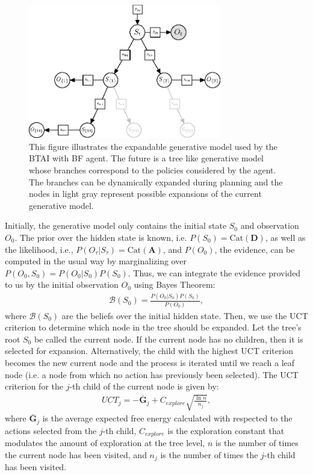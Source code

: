\documentclass[twoside,11pt]{article}
\begin{document}
\begin{figure}[H]
	\begin{center}
	\includegraphics[width=0.75\textwidth]{BTAI_BF-figure0.eps}
 	\end{center}
\vspace{-0.25cm}
    \caption{
This figure illustrates the expandable generative model used by the BTAI with BF agent. The future is a tree like generative model whose branches correspond to the policies considered by the agent. The branches can be dynamically expanded during planning and the nodes in light gray represent possible expansions of the current generative model.}
    \label{fig:BTAI_BF}
\end{figure}

Initially, the generative model only contains the initial state $S_0$ and observation $O_0$. The prior over the hidden state is known, i.e. $P(S_0) = \text{Cat}(\bm{D})$, as well as the likelihood, i.e., $P(O_\tau|S_\tau) = \text{Cat}(\bm{A})$, and $P(O_0)$, the evidence, can be computed in the usual way by marginalizing over $P(O_0,S_0) = P(O_0|S_0)P(S_0)$. Thus, we can integrate the evidence provided to us by the initial observation $O_0$ using Bayes Theorem:
\begin{align}\label{eq:initial_beliefs}
\mathcal{B}(S_0) = \frac{P(O_0|S_0)P(S_0)}{P(O_0)},
\end{align}
where $\mathcal{B}(S_0)$ are the beliefs over the initial hidden state. Then, we use the UCT criterion to determine which node in the tree should be expanded. Let the tree's root $S_0$ be called the current node. If the current node has no children, then it is selected for expansion. Alternatively, the child with the highest UCT criterion becomes the new current node and the process is iterated until we reach a leaf node (i.e. a node from which no action has previously been selected). The UCT criterion \citep{6145622} for the $j$-th child of the current node is given by:
\begin{align}\label{eq:UCT}
UCT_j = - \bar{\bm{G}}_j + C_{explore} \sqrt{\frac{\ln n}{n_j}},
\end{align}
where $\bar{\bm{G}}_j$ is the average expected free energy calculated with respected to the actions selected from the $j$-th child, $C_{explore}$ is the exploration constant that modulates the amount of exploration at the tree level, $n$ is the number of times the current node has been visited, and $n_j$ is the number of times the $j$-th child has been visited.
\end{document}

